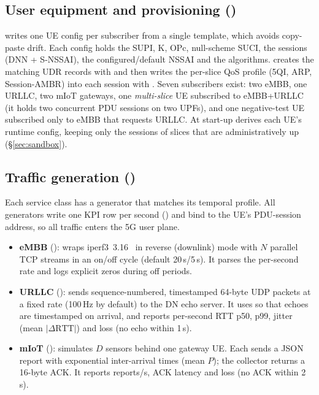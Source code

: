 \subsection{User equipment and provisioning (\memberD)}
 writes one UE config per subscriber from a single template, which avoids
copy-paste drift. Each config holds the SUPI, K, OPc, null-scheme SUCI, the sessions (DNN +
S-NSSAI), the configured/default NSSAI and the algorithms.  creates
the matching UDR records with  and then writes the per-slice QoS profile
(5QI, ARP, Session-AMBR) into each session with . Seven subscribers exist: two
eMBB, one URLLC, two mIoT gateways, one \emph{multi-slice} UE subscribed to eMBB+URLLC (it
holds two concurrent PDU sessions on two UPFs), and one negative-test UE subscribed only to
eMBB that requests URLLC. At start-up  derives each UE's runtime config,
keeping only the sessions of slices that are administratively up (\S\ref{sec:sandbox}).

\subsection{Traffic generation (\memberE)}\label{sec:traffic}
Each service class has a generator that matches its temporal profile. All generators write one
KPI row per second () and bind to the UE's PDU-session address, so all
traffic enters the 5G user plane.
\begin{itemize}
\item \textbf{eMBB} (): wraps iperf3~3.16~\cite{iperf3} in reverse (downlink)
  mode with $N$ parallel TCP streams in an on/off cycle (default 20\,s/5\,s). It parses the
  per-second rate and logs explicit zeros during off periods.
\item \textbf{URLLC} (): sends sequence-numbered, timestamped 64-byte
  UDP packets at a fixed rate (100\,Hz by default) to the DN echo server. It uses
   so that echoes are timestamped on arrival, and reports per-second RTT p50,
  p99, jitter (mean $|\Delta\text{RTT}|$) and loss (no echo within 1\,s).
\item \textbf{mIoT} (): simulates $D$ sensors behind one gateway UE. Each
  sends a JSON report with exponential inter-arrival times (mean $P$); the collector returns a
  16-byte ACK. It reports reports/s, ACK latency and loss (no ACK within 2\,s).
\end{itemize}

